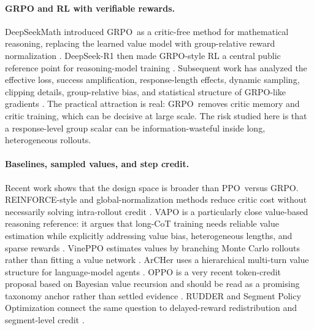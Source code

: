 \documentclass[11pt]{article}
\newcommand{\grpo}{\textsc{GRPO}}
\newcommand{\ppo}{\textsc{PPO}}
\begin{document}
\paragraph{GRPO and RL with verifiable rewards.}
DeepSeekMath introduced \grpo\ as a critic-free method for mathematical
reasoning, replacing the learned value model with group-relative reward
normalization \citep{shao2024deepseekmath}. DeepSeek-R1 then made \grpo-style
RL a central public reference point for reasoning-model training
\citep{deepseek2025r1}. Subsequent work has analyzed the effective loss,
success amplification, response-length effects, dynamic sampling, clipping
details, group-relative bias, and statistical structure of \grpo-like gradients
\citep{mroueh2025grpo,liu2025r1zero,yu2025dapo,zhou2026grpo,yang2026groupbiased,salmani2026mdpgrpo}.
The practical attraction is real: \grpo\ removes critic memory and critic
training, which can be decisive at large scale. The risk studied here is that a
response-level group scalar can be information-wasteful inside long,
heterogeneous rollouts.

\paragraph{Baselines, sampled values, and step credit.}
Recent work shows that the design space is broader than \ppo\ versus \grpo.
REINFORCE-style and global-normalization methods reduce critic cost without
necessarily solving intra-rollout credit \citep{ahmadian2024backtobasics,hu2025reinforcepp,xu2025singlestream}.
VAPO is a particularly close value-based reasoning reference: it argues that
long-CoT training needs reliable value estimation while explicitly addressing
value bias, heterogeneous lengths, and sparse rewards \citep{yue2025vapo}.
VinePPO estimates values by branching Monte Carlo rollouts rather than fitting a
value network \citep{kazemnejad2024vineppo}. ArCHer uses a hierarchical
multi-turn value structure for language-model agents \citep{zhou2024archer}.
OPPO is a very recent token-credit proposal based on Bayesian value recursion
and should be read as a promising taxonomy anchor rather than settled evidence
\citep{li2026oppo}. RUDDER and Segment Policy Optimization connect the same
question to delayed-reward redistribution and segment-level credit
\citep{arjona2018rudder,guo2025segmentpo}.
\end{document}

